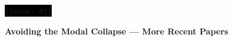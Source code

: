 \documentclass[9pt,mathserif,unknownkeysallowed,xcolor=dvipsnames]{beamer}
\newenvironment{transitionframe}[2]
{
\begin{frame}{} \Large
\centering
\colorbox{#2}{\texttt{[image: \#1]}}
\vfill
}
{

\end{frame}
}
\newenvironment{changemargin}[2]{%
  \begin{list}{}{%
    \setlength{\topsep}{0pt}%
    \setlength{\leftmargin}{#1}%
    \setlength{\rightmargin}{#2}%
    \setlength{\listparindent}{\parindent}%
    \setlength{\itemindent}{\parindent}%
    \setlength{\parsep}{\parskip}%
  }%
\item[]
}{\end{list}}
\begin{document}


\begin{transitionframe}{./Images/Transitions/GodComputerC}{black}
\textbf{
\quad Avoiding the Modal Collapse --- More Recent Papers
}
\end{transitionframe}
\end{document}
